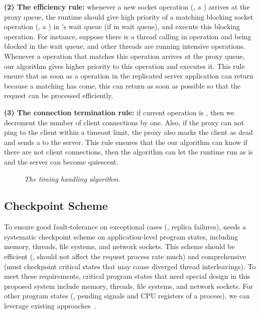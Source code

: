 \textbf{(2) The efficiency rule:} whenever a new socket operation (\eg, a \send)
arrives at the proxy queue, the \parrot runtime should give high priority of a
matching blocking socket operation (\eg, a \recv) in \parrot's wait queue (if in
wait queue), and execute this blocking operation. For instance, suppose there is
a thread calling in \recv operation and being blocked in the \parrot wait queue,
and other threads are running intensive \mutexlock operations. Whenever a \send
operation that matches this \recv operation arrives at the proxy queue, our
algorithm gives higher priority to this \recv operation and executes it. This
rule ensure that as soon as a \recv operation in the replicated server
application can return because a matching \send has come, this \recv can return
as soon as possible so that the request can be processed efficiently.

\textbf{(3) The connection termination rule:} if current \paxos operation is
\close, then we decrement the number of client connections by one. Also, if the
proxy can not ping to the client within a timeout limit, the proxy also marks
the client as dead and sends a \close to the server. This rule ensures that the
our algorithm can know if there are not client connections, then the algorithm
can let the \parrot runtime run as is and the server can become quiescent.

\begin{figure}[!ht]
\hspace{0.3in}
\begin{minipage}{.5\textwidth}
\tiny {}
\end{minipage}
\vspace{-.1in}
\caption{{\em The timing handling algorithm.}} \label{fig:msmr-wait-rule}
\vspace{-.05in}
\end{figure}




\subsection{Checkpoint Scheme} \label{sec:rep-checkpoint}

To ensure good fault-tolerance on exceptional cases (\eg, replica failures),
\crane needs a systematic checkpoint scheme on application-level program states,
including memory, threads, file systems, and network sockets. This scheme should
be efficient (\ie, should not affect the request process rate much) and
comprehensive (must checkpoint critical states that may cause diverged thread
interleavings). To meet these requirements, critical program states that need
special design in this proposed \crane system include memory, threads, file
systems, and network sockets. For other program states (\eg, pending signals and
CPU registers of a process), we can leverage existing
approaches~\cite{oren:atc07, dmtcp:ipdps09}.

